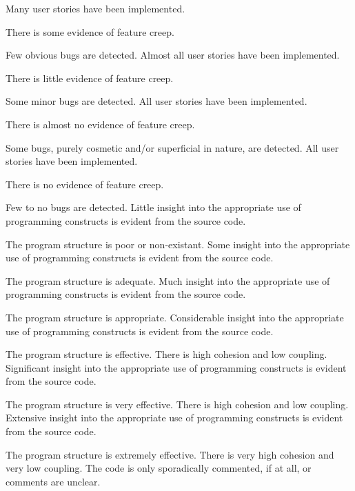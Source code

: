 \documentclass{../fal_assignment}
\begin{document}
\begin{markingrubric}
        \grade Many user stories have been implemented.
            \par There is some evidence of feature creep.
            \par Few obvious bugs  are detected.
        \grade Almost all user stories have been implemented.
            \par There is little evidence of feature creep.
            \par Some minor bugs  are detected.
        \grade All user stories have been implemented.
            \par There is almost no evidence of feature creep.
            \par Some bugs, purely cosmetic and/or superficial in nature, are detected.
        \grade All user stories have been implemented.
            \par There is no evidence of feature creep.
            \par Few to no bugs are detected.
%
        \grade \fail Little insight into the appropriate use of programming constructs is evident from the source code.
            \par The program structure is poor or non-existant.
        \grade Some insight into the appropriate use of programming constructs is evident from the source code.
            \par The program structure is adequate.
        \grade Much insight into the appropriate use of programming constructs is evident from the source code.
            \par The program structure is appropriate.
        \grade Considerable insight into the appropriate use of programming constructs is evident from the source code.
            \par The program structure is effective. There is high cohesion and low coupling.
        \grade Significant insight into the appropriate use of programming constructs is evident from the source code.
            \par The program structure is very effective. There is high cohesion and low coupling.
        \grade Extensive insight into the appropriate use of programming constructs is evident from the source code.
            \par The program structure is extremely effective. There is very high cohesion and very low coupling.
%
        \grade \fail The code is only sporadically commented, if at all, or comments are unclear.

\end{markingrubric}
\end{document}
